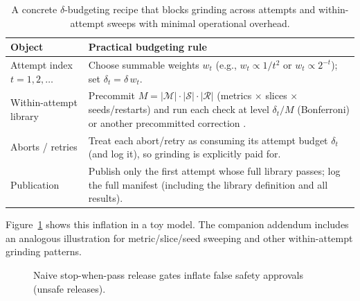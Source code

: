 \documentclass[11pt]{article}
\begin{document}
\begin{table}[t]
\centering
\begin{tabularx}{\linewidth}{@{}lX@{}}
\toprule
Object & Practical budgeting rule \\
\midrule
Attempt index $t=1,2,\dots$ & Choose summable weights $w_t$ (e.g., $w_t \propto 1/t^2$ or $w_t \propto 2^{-t}$); set $\delta_t=\delta\, w_t$.\\
Within-attempt library & Precommit $M = |\mathcal{M}|\cdot|\mathcal{S}|\cdot|\mathcal{R}|$ (metrics $\times$ slices $\times$ seeds/restarts) and run each check at level $\delta_t/M$ (Bonferroni) or another precommitted correction \cite{series:manytestinglowerbounds}.\\
Aborts / retries & Treat each abort/retry as consuming its attempt budget $\delta_t$ (and log it), so grinding is explicitly paid for.\\
Publication & Publish only the first attempt whose full library passes; log the full manifest (including the library definition and all results).\\
\bottomrule
\end{tabularx}
\caption{A concrete $\delta$-budgeting recipe that blocks grinding across attempts and within-attempt sweeps with minimal operational overhead.}
\label{tab:budget_recipe}
\end{table}

Figure~\ref{fig:stop_when_pass} shows this inflation in a toy model.
The companion addendum includes an analogous illustration for metric/slice/seed sweeping and other within-attempt grinding patterns. \cite{series:evalnotaryaddendum}


\begin{figure}[t]
\centering
{}
\caption{Naive stop-when-pass release gates inflate false safety approvals (unsafe releases).}
\label{fig:stop_when_pass}
\end{figure}


\end{document}
